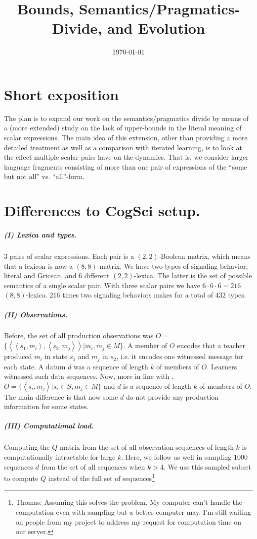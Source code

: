\documentclass[11pt]{article}
\title{Bounds, Semantics/Pragmatics-Divide, and Evolution}
\author{%
    \today
}
\date{}
\newcommand{\tuple}[1]{\ensuremath{\left\langle #1 \right\rangle}}
\begin{document}
\maketitle

\section{Short exposition}
The plan is to expand our work on the semantics/pragmatics divide by means of a (more extended) study on the lack of upper-bounds in the literal meaning of scalar expressions. The main idea of this extension, other than providing a more detailed treatment as well as a comparison with iterated learning, is to look at the effect multiple scalar pairs have on the dynamics. That is, we consider larger language fragments consisting of more than one pair of expressions of the ``some but not all'' vs. ``all''-form. 

\section{Differences to CogSci setup.}
\subparagraph{(I) Lexica and types.} $3$ pairs of scalar expressions. Each pair is a $(2,2)$-Boolean matrix, which means that a lexicon is now a $(8,8)$-matrix. We have two types of signaling behavior, literal and Gricean, and $6$ different $(2,2)$-lexica. The latter is the set of possible semantics of a single scalar pair. With three scalar pairs we have $6 \cdot 6 \cdot 6 = 216$ $(8,8)$-lexica. $216$ times two signaling behaviors makes for a total of $432$ types.

\subparagraph{(II) Observations.} Before, the set of all production observations was $O =$\linebreak  $\{\tuple{\tuple{s_1,m_i},\tuple{s_2,m_j}} | m_i, m_j \in M\}$. A member of $O$ encodes that a teacher produced $m_i$ in state $s_1$ and $m_j$ in $s_2$, i.e. it encodes one witnessed message for each state. A datum $d$ was a sequence of length $k$ of members of $O$. Learners witnessed such data sequences. Now, more in line with \citet{griffiths+kalish:2007}, $O = \{\tuple{s_i,m_j} | s_i \in S, m_j \in M\}$ and $d$ is a sequence of length $k$ of members of $O$. The main difference is that now some $d$ do not provide any production information for some states.

\subparagraph{(III) Computational load.} Computing the $Q$-matrix from the set of all observation sequences of length $k$ is computationally intractable for large $k$. Here, we follow \citet{griffiths+kalish:2007} as well in sampling $1000$ sequences $d$ from the set of all sequences when $k > 4$. We use this sampled subset to compute $Q$ instead of the full set of sequences\footnote{Thomas: Assuming this solves the problem. My computer can't handle the computation even with sampling but a better computer may. I'm still waiting on people from my project to address my request for computation time on our server.}
	      
\end{document}
